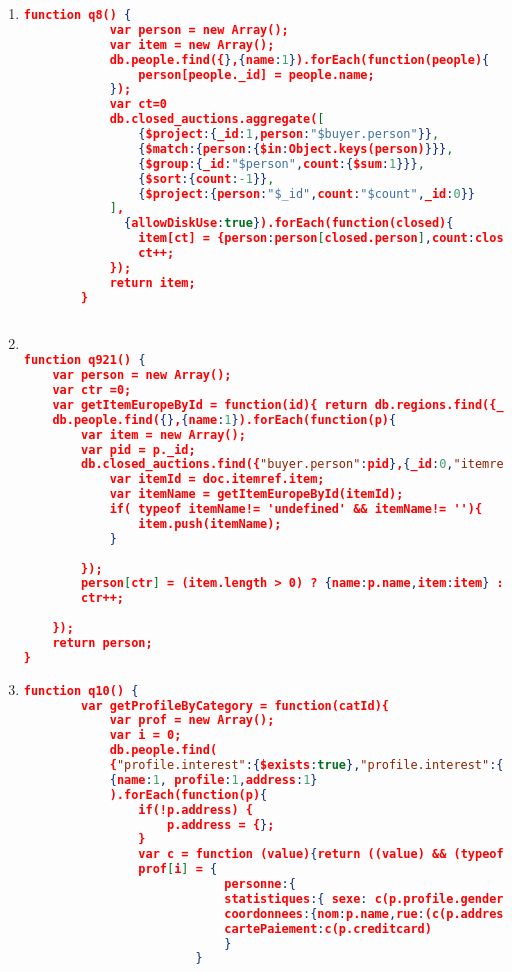 \begin{enumerate}[label=Q\arabic*]
	
    \item \label{mongodb-q-8}%
	\begin{lstlisting}[language=JSON,   basicstyle=\scriptsize]
	   function q8() {
            var person = new Array();
            var item = new Array();
            db.people.find({},{name:1}).forEach(function(people){
        		person[people._id] = people.name;
        	});
            var ct=0
            db.closed_auctions.aggregate([
        		{$project:{_id:1,person:"$buyer.person"}},
        		{$match:{person:{$in:Object.keys(person)}}},
        		{$group:{_id:"$person",count:{$sum:1}}},
        		{$sort:{count:-1}},
        		{$project:{person:"$_id",count:"$count",_id:0}}
        	],
              {allowDiskUse:true}).forEach(function(closed){
                item[ct] = {person:person[closed.person],count:closed.count}
                ct++;  
            });
            return item;
        }
        
	\end{lstlisting}
	
    \item \label{mongodb-q-9}%
	\begin{lstlisting}[language=JSON,   basicstyle=\scriptsize]
	
function q921() {
    var person = new Array();
	var ctr =0;
	var getItemEuropeById = function(id){ return db.regions.find({_id:id, regions:"europe"},{_id:0,name:1}).name;};
	db.people.find({},{name:1}).forEach(function(p){
		var item = new Array();
		var pid = p._id;
		db.closed_auctions.find({"buyer.person":pid},{_id:0,"itemref.item":1}).forEach(function(doc){
			var itemId = doc.itemref.item;
			var itemName = getItemEuropeById(itemId);
			if( typeof itemName!= 'undefined' && itemName!= ''){
				item.push(itemName);
			}
			
		});
		person[ctr] = (item.length > 0) ? {name:p.name,item:item} : {name:p.name}; 
		ctr++;
		
	});	
	return person;
}

	\end{lstlisting}
	
	
    \item \label{mongodb-q-10}%
	\begin{lstlisting}[language=JSON,   basicstyle=\scriptsize]
	function q10() {
	    var getProfileByCategory = function(catId){
    		var prof = new Array();
    		var i = 0;
    		db.people.find(
    		{"profile.interest":{$exists:true},"profile.interest":{"$elemMatch": {category:catId}}},
    		{name:1, profile:1,address:1}
    		).forEach(function(p){
    			if(!p.address) {
    				p.address = {};
    			}
    			var c = function (value){return ((value) && (typeof value !== "undefined")) ? value : "";}; 
    			prof[i] = {
    						personne:{
    						statistiques:{ sexe: c(p.profile.gender), age:c(p.profile.gender),education:c(p.profile.education),revenu:c(p.profile.income)},
    						coordonnees:{nom:p.name,rue:(c(p.address) && c(p.address.street)),ville:c(p.address.city),pays:c(p.address.country),reseau:{courrier:c(p.emailaddress), pagePerso:c(p.homepage)}},
    						cartePaiement:c(p.creditcard)
    						} 
    					}
    			

\end{lstlisting}
\end{enumerate}
